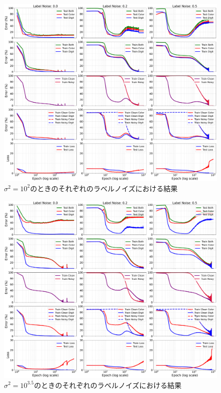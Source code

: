\begin{figure}[H]
    \centering
    \includegraphics[width=\linewidth]{fig/erroe_metrics_by_variances/error_metrics_by_label_noise_variance_1000.pdf}
    \caption{$\sigma^2 = 10^2$のときのそれぞれのラベルノイズにおける結果}
    \label{fig:errors_by_label_noise_variance_1000}
\end{figure}

\begin{figure}[H]
    \centering
    \includegraphics[width=\linewidth]{fig/erroe_metrics_by_variances/error_metrics_by_label_noise_variance_3612.pdf}
    \caption{$\sigma^2 = 10^{3.5}$のときのそれぞれのラベルノイズにおける結果}
    \label{fig:errors_by_label_noise_variance_3612}
\end{figure}

